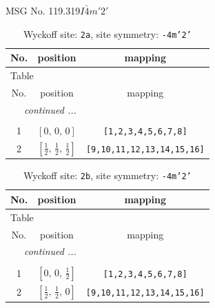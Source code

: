 \documentclass[fleqn,8pt]{jsarticle}
\begin{document}
\setcounter{MaxMatrixCols}{32}

\renewcommand{\tablename}{Table~}
\renewcommand{\figurename}{Figure~}
\begin{center}
\LARGE
MSG No. 119.319\quad$I\bar{4}m'2'$
\end{center}
\renewcommand{\arraystretch}{1.2}
\begin{longtable}{ccc}
\caption{Wyckoff site: {\tt 2a}, site symmetry: {\tt -4m'2'}}
 \\
 \hline \hline
No. & position & mapping \\ \hline \endfirsthead

\multicolumn{2}{l}{\tablename\ \thetable{}} \\
 \hline \hline
No. & position & mapping \\ \hline \endhead

 \hline \hline
\multicolumn{2}{r}{\footnotesize\it continued ...} \\ \endfoot

 \hline \hline
\multicolumn{2}{r}{} \\ \endlastfoot

1 & $\left[ 0,\, 0,\, 0 \right]$ & {\tt [1,2,3,4,5,6,7,8]} \\ \hline
2 & $\left[ \frac{1}{2},\, \frac{1}{2},\, \frac{1}{2} \right]$ & {\tt [9,10,11,12,13,14,15,16]} \\
\end{longtable}
\renewcommand{\arraystretch}{1.2}
\begin{longtable}{ccc}
\caption{Wyckoff site: {\tt 2b}, site symmetry: {\tt -4m'2'}}
 \\
 \hline \hline
No. & position & mapping \\ \hline \endfirsthead

\multicolumn{2}{l}{\tablename\ \thetable{}} \\
 \hline \hline
No. & position & mapping \\ \hline \endhead

 \hline \hline
\multicolumn{2}{r}{\footnotesize\it continued ...} \\ \endfoot

 \hline \hline
\multicolumn{2}{r}{} \\ \endlastfoot

1 & $\left[ 0,\, 0,\, \frac{1}{2} \right]$ & {\tt [1,2,3,4,5,6,7,8]} \\ \hline
2 & $\left[ \frac{1}{2},\, \frac{1}{2},\, 0 \right]$ & {\tt [9,10,11,12,13,14,15,16]} \\
\end{longtable}
\end{document}
